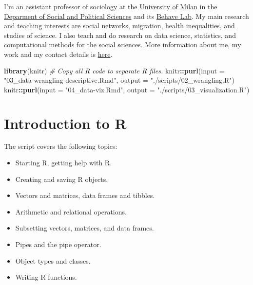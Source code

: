 \documentclass[
]{book}
\newenvironment{Shaded}{\begin{snugshade}}{\end{snugshade}}
\newcommand{\AttributeTok}[1]{\textcolor[rgb]{0.13,0.29,0.53}{#1}}
\newcommand{\CommentTok}[1]{\textcolor[rgb]{0.56,0.35,0.01}{\textit{#1}}}
\newcommand{\FunctionTok}[1]{\textcolor[rgb]{0.13,0.29,0.53}{\textbf{#1}}}
\newcommand{\NormalTok}[1]{#1}
\newcommand{\SpecialCharTok}[1]{\textcolor[rgb]{0.81,0.36,0.00}{\textbf{#1}}}
\newcommand{\StringTok}[1]{\textcolor[rgb]{0.31,0.60,0.02}{#1}}
\providecommand{\tightlist}{%
  \setlength{\itemsep}{0pt}\setlength{\parskip}{0pt}}
\begin{document}
I'm an assistant professor of sociology at the \href{https://www.unimi.it/en}{University of Milan} in the \href{http://eng.sps.unimi.it/ecm/home}{Deparment of Social and Political Sciences} and its \href{https://behavelab.org/}{Behave Lab}. My main research and teaching interests are social networks, migration, health inequalities, and studies of science. I also teach and do research on data science, statistics, and computational methods for the social sciences. More information about me, my work and my contact details is \href{http://www.raffaelevacca.com/}{here}.

\begin{Shaded}
\begin{Highlighting}[]
\FunctionTok{library}\NormalTok{(knitr)}
\CommentTok{\# Copy all R code to separate R files.}
\NormalTok{knitr}\SpecialCharTok{::}\FunctionTok{purl}\NormalTok{(}\AttributeTok{input =} \StringTok{"03\_data{-}wrangling{-}descriptive.Rmd"}\NormalTok{,}
            \AttributeTok{output =} \StringTok{"./scripts/02\_wrangling.R"}\NormalTok{)}
\NormalTok{knitr}\SpecialCharTok{::}\FunctionTok{purl}\NormalTok{(}\AttributeTok{input =} \StringTok{"04\_data{-}viz.Rmd"}\NormalTok{,}
            \AttributeTok{output =} \StringTok{"./scripts/03\_visualization.R"}\NormalTok{)}
\end{Highlighting}
\end{Shaded}

\hypertarget{intro}{%
\chapter{Introduction to R}\label{intro}}

The script covers the following topics:

\begin{itemize}
\tightlist
\item
  Starting R, getting help with R.
\item
  Creating and saving R objects.
\item
  Vectors and matrices, data frames and tibbles.
\item
  Arithmetic and relational operations.
\item
  Subsetting vectors, matrices, and data frames.
\item
  Pipes and the pipe operator.
\item
  Object types and classes.
\item
  Writing R functions.
\end{itemize}
\end{document}
